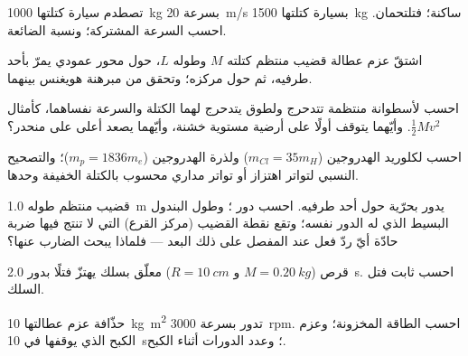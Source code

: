 \begin{exercise}[$\star$]\label{exo:b1:systems-of-points:3}
تصطدم سيارة كتلتها \qty{1000}{kg} بسرعة \qty{20}{m/s} بسيارة كتلتها \qty{1500}{kg} ساكنة؛
فتلتحمان. احسب السرعة المشتركة؛ ونسبة  الضائعة.
\end{exercise}

\begin{exercise}[$\star$]\label{exo:b1:systems-of-points:4}
اشتقّ عزم عطالة قضيب منتظم كتلته $M$ وطوله $L$،
حول محور عمودي يمرّ بأحد طرفيه، ثم حول مركزه؛
وتحقق من مبرهنة هويغنس بينهما.
\end{exercise}

\begin{exercise}[$\star\star$]\label{exo:b1:systems-of-points:5}
احسب  لأسطوانة منتظمة تتدحرج ولطوق يتدحرج
لهما الكتلة والسرعة نفساهما، كأمثال $\tfrac12 Mv^2$. وأيّهما يتوقف
أولًا على أرضية مستوية خشنة، وأيّهما يصعد أعلى على منحدر؟
\end{exercise}

\begin{exercise}[$\star\star$]\label{exo:b1:systems-of-points:6}
احسب  لكلوريد الهدروجين ($m_{Cl} = 35m_H$) ولذرة الهدروجين
($m_p = 1836m_e$)؛ والتصحيح النسبي لتواتر اهتزاز أو تواتر
مداري محسوب بالكتلة الخفيفة وحدها.
\end{exercise}

\begin{exercise}[$\star\star$]\label{exo:b1:systems-of-points:7}
قضيب منتظم طوله \qty{1.0}{m} يدور بحرّية حول أحد طرفيه. احسب دور
؛ وطول البندول البسيط الذي له الدور نفسه؛
وتقع نقطة القضيب (مركز القرع) التي لا تنتج فيها ضربة حادّة أيّ
ردّ فعل عند المفصل على ذلك البعد --- فلماذا يبحث
الضارب عنها؟
\end{exercise}

\begin{exercise}[$\star\star$]\label{exo:b1:systems-of-points:8}
قرص ($M = \qty{0.20}{kg}$ و $R = \qty{10}{cm}$) معلّق بسلك
يهتزّ فتلًا بدور \qty{2.0}{s}. احسب ثابت فتل
السلك.
\end{exercise}

\begin{exercise}[$\star\star$]\label{exo:b1:systems-of-points:9}
حذّافة عزم عطالتها \qty{10}{kg.m^2} تدور بسرعة \qty{3000}{rpm}.
احسب الطاقة المخزونة؛ وعزم الكبح الذي يوقفها في \qty{10}{s}؛ وعدد
الدورات أثناء الكبح.
\end{exercise}

